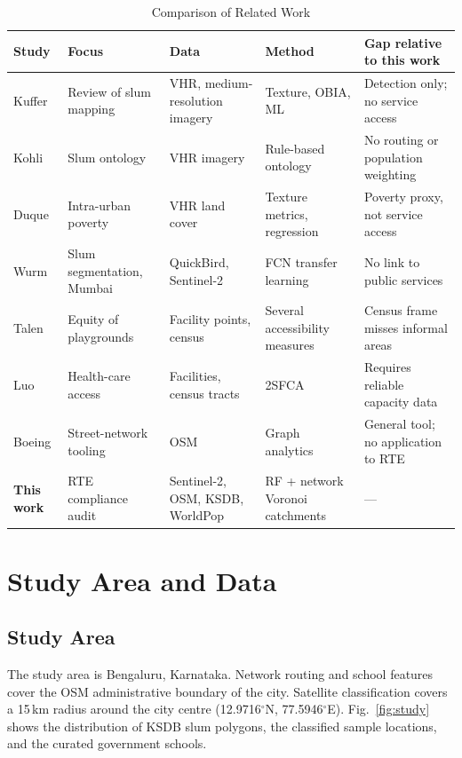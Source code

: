 \documentclass[conference]{IEEEtran}
\newcommand{\km}{\,km}
\begin{document}
\begin{table}[!t]
\centering
\caption{Comparison of Related Work}
\label{tab:lit}
\footnotesize
\begin{tabularx}{\textwidth}{@{}p{1.6cm}p{3.0cm}p{3.1cm}p{3.1cm}X@{}}
\toprule
\textbf{Study} & \textbf{Focus} & \textbf{Data} & \textbf{Method} & \textbf{Gap relative to this work} \\
\midrule
Kuffer \cite{kuffer2016} & Review of slum mapping & VHR, medium-resolution imagery & Texture, OBIA, ML & Detection only; no service access \\
Kohli \cite{kohli2012} & Slum ontology & VHR imagery & Rule-based ontology & No routing or population weighting \\
Duque \cite{duque2015} & Intra-urban poverty & VHR land cover & Texture metrics, regression & Poverty proxy, not service access \\
Wurm \cite{wurm2019} & Slum segmentation, Mumbai & QuickBird, Sentinel-2 & FCN transfer learning & No link to public services \\
Talen \cite{talen1998} & Equity of playgrounds & Facility points, census & Several accessibility measures & Census frame misses informal areas \\
Luo \cite{luo2003} & Health-care access & Facilities, census tracts & 2SFCA & Requires reliable capacity data \\
Boeing \cite{boeing2017} & Street-network tooling & OSM & Graph analytics & General tool; no application to RTE \\
\textbf{This work} & RTE compliance audit & Sentinel-2, OSM, KSDB, WorldPop & RF + network Voronoi catchments & --- \\
\bottomrule
\end{tabularx}
\end{table}

\section{Study Area and Data}\label{sec:data}
\subsection{Study Area}
The study area is Bengaluru, Karnataka. Network routing and school features cover the OSM administrative boundary of the city. Satellite classification covers a 15\km{} radius around the city centre (12.9716$^\circ$N, 77.5946$^\circ$E). Fig.~\ref{fig:study} shows the distribution of KSDB slum polygons, the classified sample locations, and the curated government schools.
\end{document}
